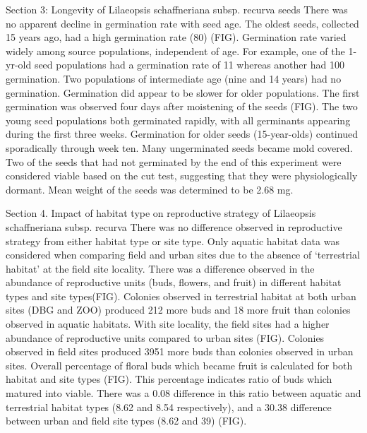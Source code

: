 \documentclass[twocolumn]{article}
\begin{document}
Section 3: Longevity of Lilaeopsis schaffneriana subsp. recurva seeds
There was no apparent decline in germination rate with seed age. The oldest seeds, collected 15 years ago, had a high germination rate (80) (FIG). Germination rate varied widely among source populations, independent of age. For example, one of the 1-yr-old seed populations had a germination rate of 11 whereas another had 100 germination. Two populations of intermediate age (nine and 14 years) had no germination. Germination did appear to be slower for older populations. The first germination was observed four days after moistening of the seeds (FIG). The two young seed populations both germinated rapidly, with all germinants appearing during the first three weeks. Germination for older seeds (15-year-olds) continued sporadically through week ten.  Many ungerminated seeds became mold covered. Two of the seeds that had not germinated by the end of this experiment were considered viable based on the cut test, suggesting that they were physiologically dormant.  Mean weight of the seeds was determined to be 2.68 mg.

Section 4. Impact of habitat type on reproductive strategy of Lilaeopsis schaffneriana subsp. recurva 
There was no difference observed in reproductive strategy from either habitat type or site type. Only aquatic habitat data was considered when comparing field and urban sites due to the absence of ‘terrestrial habitat’ at the field site locality. There was a difference observed in the abundance of reproductive units (buds, flowers, and fruit) in different habitat types and site types(FIG). Colonies observed in terrestrial habitat at both urban sites (DBG and ZOO) produced 212 more buds and 18 more fruit than colonies observed in aquatic habitats. With site locality, the field sites had a higher abundance of reproductive units compared to urban sites (FIG). Colonies observed in field sites produced 3951 more buds than colonies observed in urban sites. Overall percentage of floral buds which became fruit is calculated for both habitat and site types (FIG). This percentage indicates ratio of buds which matured into viable. There was a 0.08 difference in this ratio between aquatic and terrestrial habitat types (8.62 and 8.54 respectively), and a 30.38 difference between urban and field site types (8.62 and 39) (FIG).
\end{document}
